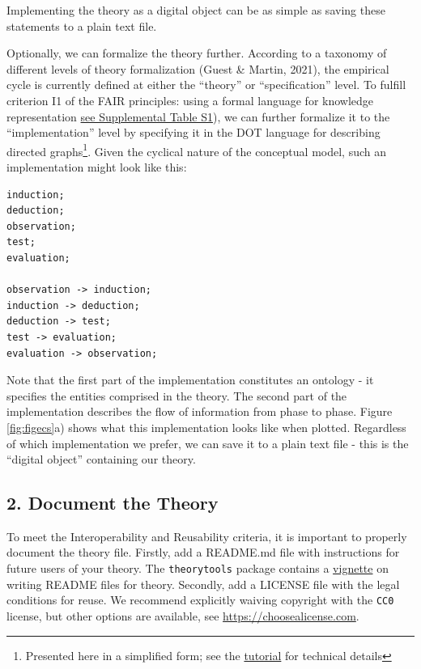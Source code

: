 \documentclass[
  man, noextraspace,floatsintext]{apa7}
\begin{document}
Implementing the theory as a digital object can be as simple as saving these statements to a plain text file.

Optionally, we can formalize the theory further.
According to a taxonomy of different levels of theory formalization (Guest \& Martin, 2021),
the empirical cycle is currently defined at either the ``theory'' or ``specification'' level.
To fulfill criterion I1 of the FAIR principles: using a formal language for knowledge representation \href{https://github.com/cjvanlissa/fair_theory/blob/main/fair_principles.csv}{see Supplemental Table S1}), we can further formalize it to the ``implementation'' level by specifying it in the DOT language for describing directed graphs\footnote{Presented here in a simplified form; see the \href{https://cjvanlissa.github.io/theorytools/articles/fair-theory.html}{tutorial} for technical details}.
Given the cyclical nature of the conceptual model, such an implementation might look like this:

\begin{verbatim}
induction;
deduction;
observation;
test;
evaluation;

observation -> induction;
induction -> deduction;
deduction -> test;
test -> evaluation;
evaluation -> observation;
\end{verbatim}

Note that the first part of the implementation constitutes an ontology - it specifies the entities comprised in the theory.
The second part of the implementation describes the flow of information from phase to phase.
Figure \ref{fig:figecs}a) shows what this implementation looks like when plotted.
Regardless of which implementation we prefer,
we can save it to a plain text file - this is the ``digital object'' containing our theory.

\subsection{2. Document the Theory}\label{document-the-theory}

To meet the Interoperability and Reusability criteria,
it is important to properly document the theory file.
Firstly, add a README.md file with instructions for future users of your theory.
The \texttt{theorytools} package contains a \href{https://cjvanlissa.github.io/theorytools/articles/readme.html}{vignette} on writing README files for theory.
Secondly, add a LICENSE file with the legal conditions for reuse.
We recommend explicitly waiving copyright with the \texttt{CC0} license, but other options are available, see \href{https://choosealicense.com/non-software/}{https://choosealicense.com}.
\end{document}

